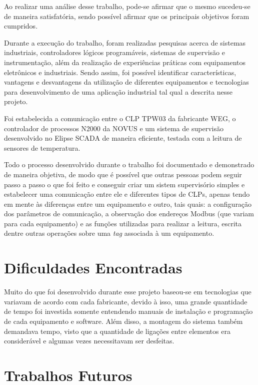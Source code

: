 \label{Cap:conclusao}

Ao realizar uma análise desse trabalho, pode-se afirmar que o mesmo sucedeu-se de maneira satisfatória, sendo possível afirmar que os principais objetivos foram cumpridos. 

Durante a execução do trabalho, foram realizadas pesquisas acerca de sistemas industriais, controladores lógicos programáveis, sistemas de supervisão e instrumentação, além da realização de experiências práticas com equipamentos eletrônicos e industriais. Sendo assim, foi possível identificar características, vantagens e desvantagens da utilização de diferentes equipamentos e tecnologias para desenvolvimento de uma aplicação industrial tal qual a descrita nesse projeto.

Foi estabelecida a comunicação entre o CLP TPW03 da fabricante WEG, o controlador de processos N2000 da NOVUS e um sistema de supervisão desenvolvido no Elipse SCADA de maneira eficiente, testada com a leitura de sensores de temperatura.

Todo o processo desenvolvido durante o trabalho foi documentado e demonstrado de maneira objetiva, de modo que é possível que outras pessoas podem seguir passo a passo o que foi feito e conseguir criar um sistem supervisório simples e estabelecer uma comunicação entre ele e diferentes tipos de CLPs, apenas tendo em mente às diferenças entre um equipamento e outro, tais quais: a configuração dos parâmetros de comunicação, a observação dos endereços Modbus (que variam para cada equipamento) e as funções utilizadas para realizar a leitura, escrita dentre outras operações sobre uma \textit{tag} associada à um equipamento.

\section{Dificuldades Encontradas}

Muito do que foi desenvolvido durante esse projeto baseou-se em tecnologias que variavam de acordo com cada fabricante, devido à isso, uma grande quantidade de tempo foi investida somente entendendo manuais de instalação e programação de cada equipamento e software. Além disso, a montagem do sistema também demandava tempo, visto que a quantidade de ligações entre elementos era considerável e algumas vezes necessitavam ser desfeitas.

\section{Trabalhos Futuros}

